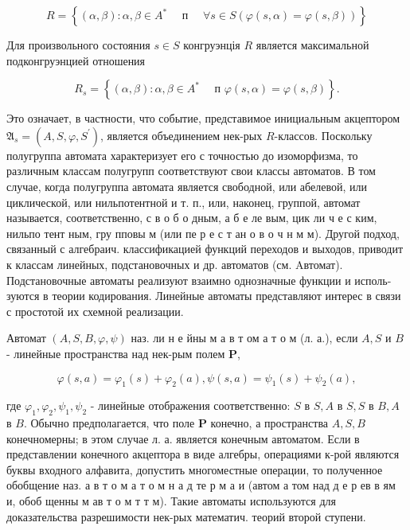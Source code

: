 \documentclass[10pt]{article}
\begin{document}
\[

R=\left\{(\alpha, \beta): \alpha, \beta \in A^{*} \quad \text { п } \quad \forall s \in S(\varphi(s, \alpha)=\varphi(s, \beta))\right\}

\]



Для произвольного состояния $s \in S$ конгруэнція $R$ является максимальной подконгруэнцией отношения



\[

R_{s}=\left\{(\alpha, \beta): \alpha, \beta \in A^{*} \quad \text { п } \varphi(s, \alpha)=\varphi(s, \beta)\right\} .

\]



Это означает, в частности, что событие, представимое инициальным акцептором $\mathfrak{A}_{s}=\left(A, S, \varphi, S^{\prime}\right)$, является объединением нек-рых $R$-классов. Поскольку полугруппа автомата характеризует его с точностью до изоморфизма, то различным классам полугрупп соответствуют свои классы автоматов. В том случае, когда полугруппа автомата является свободной, или абелевой, или циклической, или нильпотентной и т. п., или, наконец, группой, автомат называется, соответственно, с в о б о дным, а б е ле вым, цик ли ч е с ким, нильпо тент ным, гру пповы м (или пе р е с т ан о в о ч н м м). Другой подход, связанный с алгебраич. классификацией функций переходов и выходов, приводит к классам линейных, подстановочных и др. автоматов (см. Aвтомат). Подстановочные автоматы реализуют взаимно однозначные функции и исполь- зуются в теории кодирования. Линейные автоматы представляют интерес в связи с простотой их схемной реализации.



Автомат $(A, S, B, \varphi, \psi)$ наз. ли н е йны м а в т ом а т о м (л. а.), если $A, S$ и $B$ - линейные пространства над нек-рым полем $\boldsymbol{P}$,



\[

\varphi(s, a)=\varphi_{1}(s)+\varphi_{2}(a), \psi(s, a)=\psi_{1}(s)+\psi_{2}(a),

\]



где $\varphi_{1}, \varphi_{2}, \psi_{1}, \psi_{2}$ - линейные отображения соответственно: $S$ в $S, A$ в $S, S$ в $B, A$ в $B$. Обычно предполагается, что поле $\boldsymbol{P}$ конечно, а пространства $A, S, B$ конечномерны; в этом случае л. а. является конечным автоматом. Если в представлении конечного акцептора в виде алгебры, операциями к-рой являются буквы входного алфавита, допустить многоместные операции, то полученное обобщение наз. а в т о м а т о м н а д те р м а и (автом а том над д е р ев в ям и, обоб щенны м ав т о м т т м). Такие автоматы используются для доказательства разрешимости нек-рых математич. теорий второй ступени.
\end{document}
